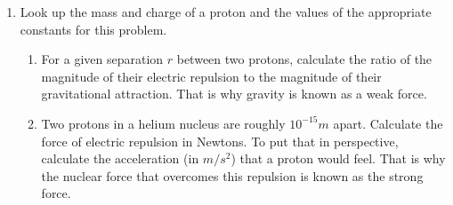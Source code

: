 \documentclass[fleqn]{article}
\begin{document}
\begin{enumerate}
    \item Look up the mass and charge of a proton and the values of the appropriate constants for this problem.
    \begin{enumerate}
      \item For a given separation $r$ between two protons, calculate the ratio
      of the magnitude of their electric repulsion to the magnitude of
      their gravitational attraction. That is why gravity is known as a
      weak force.

        

      \item Two protons in a helium nucleus are roughly $10^{-15}m$ apart. Calculate the force of 
      electric repulsion in Newtons. To put that in perspective, calculate the acceleration (in $m/s^2$) that a proton
      would feel. That is why the nuclear force that overcomes this repulsion is known as the strong force.

        

    \end{enumerate}

  \end{enumerate}
\end{document}
